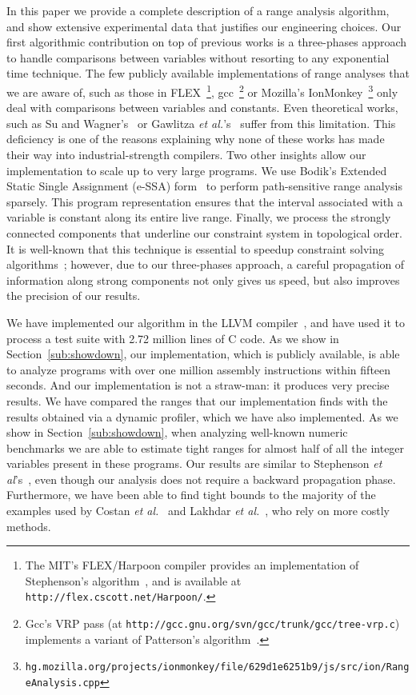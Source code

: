 \documentclass[preprint]{elsarticle}
\begin{document}
In this paper we provide a complete description of a range analysis algorithm,
and show extensive experimental data that justifies our engineering choices.
Our first algorithmic contribution on top of previous works is a three-phases
approach to handle comparisons between variables without resorting to any
exponential time technique.
The few publicly available implementations of range analyses that we are
aware of, such as those in FLEX~\footnote{The MIT's FLEX/Harpoon compiler
provides an implementation of Stephenson's algorithm~\cite{Stephenson00}, and
is available at \texttt{http://flex.cscott.net/Harpoon/}.},
gcc~\footnote{Gcc's VRP pass (at \texttt{http://gcc.gnu.org/svn/gcc/trunk/gcc/tree-vrp.c}) implements a variant of Patterson's
algorithm~\cite{Patterson95}.} or Mozilla's IonMonkey~\footnote{\texttt{hg.mozilla.org/projects/ionmonkey/file/629d1e6251b9/js/src/ion/RangeAnalysis.cpp}} only deal with comparisons between variables and
constants.
Even theoretical works, such as Su and Wagner's~\cite{Su05} or Gawlitza
{\em et al.}'s~\cite{Gawlitza09} suffer from this limitation.
This deficiency is one of the reasons explaining why none of these works has
made their way into industrial-strength compilers.
Two other insights allow our implementation to scale up to very large
programs.
We use Bodik's Extended Static Single Assignment (e-SSA) form~\cite{Bodik00} to
perform path-sensitive range analysis sparsely.
This program representation ensures that the interval associated with
a variable is constant along its entire live range.
Finally, we process the strongly connected components that underline our
constraint system in topological order.
It is well-known that this technique is essential to speedup constraint solving
algorithms~\cite[Sec 6.3]{Nielson99}; however, due to our three-phases
approach, a careful propagation of information along strong components not only
gives us speed, but also improves the precision of our results.

We have implemented our algorithm in the LLVM compiler~\cite{Lattner04}, and
have used it to process a test suite with 2.72 million lines of C code.
As we show in Section~\ref{sub:showdown}, our implementation, which is
publicly available, is able to analyze programs with over one million assembly
instructions within fifteen seconds.
And our implementation is not a straw-man: it produces very precise results.
We have compared the ranges that our implementation finds with the results
obtained via a dynamic profiler, which we have also implemented.
As we show in Section~\ref{sub:showdown}, when analyzing well-known numeric
benchmarks we are able to estimate tight ranges for almost half of all the
integer variables present in these programs.
Our results are similar to Stephenson
{\em et al}'s~\cite{Stephenson00}, even though our analysis does not require
a backward propagation phase.
Furthermore, we have been able to find tight bounds to the majority of the
examples used by Costan {\em et al.}~\cite{Costan05} and Lakhdar
{\em et al.}~\cite{Lakhdar11}, who rely on more costly methods.
\end{document}
